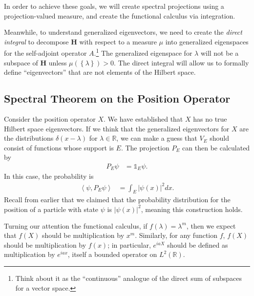 \documentclass[10pt]{extarticle}
\newcommand{\R}{\mathbb{R}}
\newcommand{\set}[1]{\left\{#1\right\}}
\newcommand{\iprod}[2]{\left\langle #1,#2\right\rangle}
\theoremstyle{plain}
\theoremstyle{definition}
\theoremstyle{remark}
\renewcommand{\newline}{\hfill\break}
\begin{document}
  In order to achieve these goals, we will create spectral projections using a projection-valued measure, and create the functional calculus via integration.\newline

  Meanwhile, to understand generalized eigenvectors, we need to create the \textit{direct integral} to decompose $\mathbf{H}$ with respect to a measure $\mu$ into generalized eigenspaces for the self-adjoint operator $A$.\footnote{Think about it as the ``continuous'' analogue of the direct sum of subspaces for a vector space.} The generalized eigenspace for $\lambda$ will not be a subspace of $\mathbf{H}$ unless $\mu\left(\set{\lambda}\right) > 0$. The direct integral will allow us to formally define ``eigenvectors'' that are not elements of the Hilbert space.
  \subsection{Spectral Theorem on the Position Operator}%
  Consider the position operator $X$. We have established that $X$ has no true Hilbert space eigenvectors. If we think that the generalized eigenvectors for $X$ are the distributions $\delta(x-\lambda)$ for $\lambda \in \R$, we can make a guess that $V_E$ should consist of functions whose support is $E$. The projection $P_E$ can then be calculated by
  \begin{align*}
    P_E\psi &= \mathbb{1}_{E}\psi.
  \end{align*}
  In this case, the probability is
  \begin{align*}
    \iprod{\psi}{P_E\psi} &= \int_{E}|\psi(x)|^2dx.
  \end{align*}
  Recall from earlier that we claimed that the probability distribution for the position of a particle with state $\psi$ is $|\psi(x)|^2$, meaning this construction holds.\newline

  Turning our attention the functional calculus, if $f(\lambda) = \lambda^m$, then we expect that $f(X)$ should be multiplication by $x^m$. Similarly, for any function $f$, $f(X)$ should be multiplication by $f(x)$; in particular, $e^{iaX}$ should be defined as multiplication by $e^{iax}$, itself a bounded operator on $L^2(\R)$.
\end{document}
